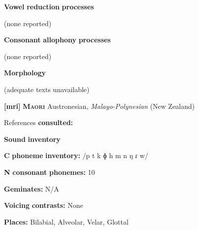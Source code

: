 \documentclass[output=paper]{langsci/langscibook}
\begin{document}
\begin{styleBody}
\textbf{Vowel} \textbf{reduction} \textbf{processes}
\end{styleBody}

\begin{styleBody}
(none reported)
\end{styleBody}

\begin{styleBody}
\textbf{Consonant} \textbf{allophony} \textbf{processes}
\end{styleBody}

\begin{styleBody}
(none reported)
\end{styleBody}

\begin{styleBody}
\textbf{Morphology}
\end{styleBody}

\begin{styleBody}
(adequate texts unavailable)
\end{styleBody}

\begin{styleBody}
\textbf{[mri]}   \textbf{\textsc{Maori}}  Austronesian, \textit{Malayo-Polynesian} (New Zealand)
\end{styleBody}

\begin{styleBody}
References \textbf{consulted:} \citet{Bauer1999}
\end{styleBody}

\begin{styleBody}
\textbf{Sound} \textbf{inventory}
\end{styleBody}

\begin{styleBody}
\textbf{C} \textbf{phoneme} \textbf{inventory:} /p t k ɸ h m n ŋ ɾ w/
\end{styleBody}

\begin{styleBody}
\textbf{N} \textbf{consonant} \textbf{phonemes:} 10
\end{styleBody}

\begin{styleBody}
\textbf{Geminates:} N/A
\end{styleBody}

\begin{styleBody}
\textbf{Voicing} \textbf{contrasts:} None
\end{styleBody}

\begin{styleBody}
\textbf{Places:} Bilabial, Alveolar, Velar, Glottal
\end{styleBody}
\end{document}
